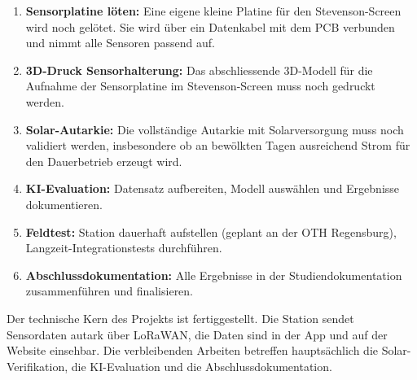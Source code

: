 \documentclass[11pt,a4paper]{scrartcl}
\begin{document}
\begin{enumerate}
  \item \textbf{Sensorplatine löten:} Eine eigene kleine Platine für den Stevenson-Screen
        wird noch gelötet. Sie wird über ein Datenkabel mit dem PCB verbunden und
        nimmt alle Sensoren passend auf.

  \item \textbf{3D-Druck Sensorhalterung:} Das abschliessende 3D-Modell für die
        Aufnahme der Sensorplatine im Stevenson-Screen muss noch gedruckt werden.

  \item \textbf{Solar-Autarkie:} Die vollständige Autarkie mit Solarversorgung muss
        noch validiert werden, insbesondere ob an bewölkten Tagen ausreichend Strom
        für den Dauerbetrieb erzeugt wird.

  \item \textbf{KI-Evaluation:} Datensatz aufbereiten, Modell auswählen
        und Ergebnisse dokumentieren.

  \item \textbf{Feldtest:} Station dauerhaft aufstellen (geplant an der OTH
        Regensburg), Langzeit-Integrationstests durchführen.

  \item \textbf{Abschlussdokumentation:} Alle Ergebnisse in der Studiendokumentation
        zusammenführen und finalisieren.
\end{enumerate}

\vspace{1em}
\noindent Der technische Kern des Projekts ist fertiggestellt. Die Station sendet
Sensordaten autark über LoRaWAN, die Daten sind in der App und auf der Website
einsehbar. Die verbleibenden Arbeiten betreffen hauptsächlich die Solar-Verifikation,
die KI-Evaluation und die Abschlussdokumentation.
\end{document}
